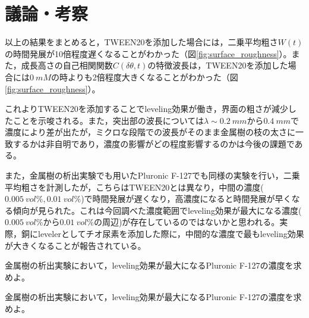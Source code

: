 \documentclass[autodetect-engine,dvi=dvipdfmx,a4paper,ja=standard,oneside,openany,11pt,draft]{bxjsbook}
\begin{document}
\section{議論・考察}
以上の結果をまとめると，TWEEN20を添加した場合には，二乗平均粗さ$W(t)$の時間発展が10倍程度遅くなることがわかった（図\ref{fig:surface_roughness}）。また，成長高さの自己相関関数$C(\delta\theta,t)$の特徴波長は，TWEEN20を添加した場合には$\SI{0}{mM}$の時よりも2倍程度大きくなることがわかった（図\ref{fig:surface_roughness}）。

これよりTWEEN20を添加することでleveling効果が働き，界面の粗さが減少したことを示唆される。また，突出部の波長については$\lambda\sim\SI{0.2}{mm}$から$\SI{0.4}{mm}$で濃度により差が出たが，ミクロな段階での波長がそのまま金属樹の枝の太さに一致するかは非自明であり，濃度の影響がどの程度影響するのかは今後の課題である。

また，金属樹の析出実験でも用いたPluronic F-127でも同様の実験を行い，二乗平均粗さを計測したが，こちらはTWEEN20とは異なり，中間の濃度($\SI{0.005}{vol\%},\SI{0.01}{vol\%}$)で時間発展が遅くなり，高濃度になると時間発展が早くなる傾向が見られた。これは今回調べた濃度範囲でleveling効果が最大になる濃度($\SI{0.005}{vol\%}$から$\SI{0.01}{vol\%}$の周辺)が存在しているのではないかと思われる。実際，銅にlevelerとしてチオ尿素を添加した際に，中間的な濃度で最もleveling効果が大きくなることが報告されている\cite{schilardi2000stable}。

\begin{defi}
  金属樹の析出実験において，leveling効果が最大になるPluronic F-127の濃度を求めよ。
\end{defi}

\begin{prob}
  金属樹の析出実験において，leveling効果が最大になるPluronic F-127の濃度を求めよ。
\end{prob}
\ifdraft{
  
  
}{}
\end{document}
